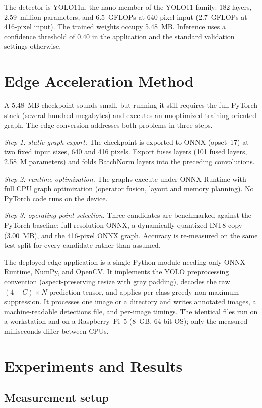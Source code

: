 \documentclass[conference]{IEEEtran}
\begin{document}
The detector is YOLO11n, the nano member of the YOLO11 family: 182 layers,
2.59~million parameters, and 6.5~GFLOPs at 640-pixel input (2.7~GFLOPs at
416-pixel input). The trained weights occupy 5.48~MB. Inference uses a
confidence threshold of 0.40 in the application and the standard validation
settings otherwise.

\section{Edge Acceleration Method}
\label{sec:method}

A 5.48~MB checkpoint sounds small, but running it still requires the full
PyTorch stack (several hundred megabytes) and executes an unoptimized
training-oriented graph. The edge conversion addresses both problems in three
steps.

\emph{Step 1: static-graph export.} The checkpoint is exported to ONNX
(opset~17) at two fixed input sizes, 640 and 416 pixels. Export fuses layers
(101 fused layers, 2.58~M parameters) and folds BatchNorm layers into the
preceding convolutions.

\emph{Step 2: runtime optimization.} The graphs execute under ONNX Runtime
with full CPU graph optimization (operator fusion, layout and memory
planning). No PyTorch code runs on the device.

\emph{Step 3: operating-point selection.} Three candidates are benchmarked
against the PyTorch baseline: full-resolution ONNX, a dynamically quantized
INT8 copy (3.00~MB), and the 416-pixel ONNX graph. Accuracy is re-measured on
the same test split for every candidate rather than assumed.

The deployed edge application is a single Python module needing only ONNX
Runtime, NumPy, and OpenCV. It implements the YOLO preprocessing convention
(aspect-preserving resize with gray padding), decodes the raw
$(4 + C) \times N$ prediction tensor, and applies per-class greedy
non-maximum suppression. It processes one image or a directory and writes
annotated images, a machine-readable detections file, and per-image timings.
The identical files run on a workstation and on a Raspberry~Pi~5 (8~GB,
64-bit OS); only the measured milliseconds differ between CPUs.

\section{Experiments and Results}
\label{sec:exp}

\subsection{Measurement setup}
\end{document}
